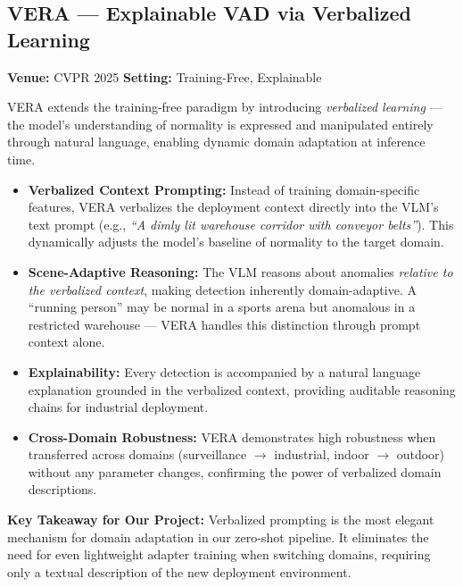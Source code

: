 \documentclass[12pt, a4paper]{article}
\begin{document}
\subsection{VERA --- Explainable VAD via Verbalized Learning \cite{ye2025vera}}

\textbf{Venue:} CVPR 2025 \hfill \textbf{Setting:} Training-Free, Explainable

VERA extends the training-free paradigm by introducing \textit{verbalized learning} --- the model's understanding of normality is expressed and manipulated entirely through natural language, enabling dynamic domain adaptation at inference time.

\begin{itemize}[leftmargin=*]
    \item \textbf{Verbalized Context Prompting:} Instead of training domain-specific features, VERA verbalizes the deployment context directly into the VLM's text prompt (e.g., \textit{``A dimly lit warehouse corridor with conveyor belts''}). This dynamically adjusts the model's baseline of normality to the target domain.
    
    \item \textbf{Scene-Adaptive Reasoning:} The VLM reasons about anomalies \textit{relative to the verbalized context}, making detection inherently domain-adaptive. A ``running person'' may be normal in a sports arena but anomalous in a restricted warehouse --- VERA handles this distinction through prompt context alone.
    
    \item \textbf{Explainability:} Every detection is accompanied by a natural language explanation grounded in the verbalized context, providing auditable reasoning chains for industrial deployment.
    
    \item \textbf{Cross-Domain Robustness:} VERA demonstrates high robustness when transferred across domains (surveillance $\rightarrow$ industrial, indoor $\rightarrow$ outdoor) without any parameter changes, confirming the power of verbalized domain descriptions.
\end{itemize}

\textbf{Key Takeaway for Our Project:} Verbalized prompting is the most elegant mechanism for domain adaptation in our zero-shot pipeline. It eliminates the need for even lightweight adapter training when switching domains, requiring only a textual description of the new deployment environment.

\end{document}
